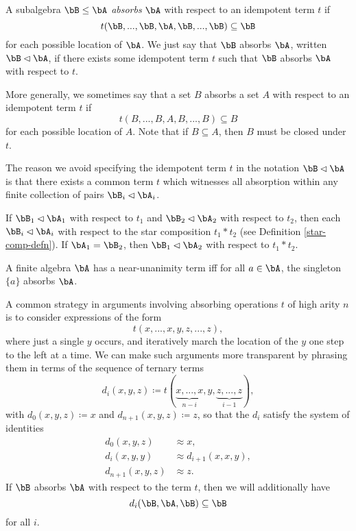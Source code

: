 \begin{defn} A subalgebra $\bB \le \bA$ \emph{absorbs} $\bA$ with respect to an idempotent term $t$ if
\[
t(\bB, ..., \bB, \bA, \bB, ..., \bB) \subseteq \bB
\]
for each possible location of $\bA$. We just say that $\bB$ absorbs $\bA$, written $\bB \lhd \bA$, if there exists some idempotent term $t$ such that $\bB$ absorbs $\bA$ with respect to $t$.

More generally, we sometimes say that a set $B$ absorbs a set $A$ with respect to an idempotent term $t$ if
\[
t(B, ..., B, A, B, ..., B) \subseteq B
\]
for each possible location of $A$. Note that if $B \subseteq A$, then $B$ must be closed under $t$.
\end{defn}

The reason we avoid specifying the idempotent term $t$ in the notation $\bB \lhd \bA$ is that there exists a common term $t$ which witnesses all absorption within any finite collection of pairs $\bB_i \lhd \bA_i$.

\begin{prop} If $\bB_1 \lhd \bA_1$ with respect to $t_1$ and $\bB_2 \lhd \bA_2$ with respect to $t_2$, then each $\bB_i \lhd \bA_i$ with respect to the star composition $t_1*t_2$ (see Definition \ref{star-comp-defn}). If $\bA_1 = \bB_2$, then $\bB_1 \lhd \bA_2$ with respect to $t_1*t_2$.
\end{prop}

\begin{cor} A finite algebra $\bA$ has a near-unanimity term iff for all $a \in \bA$, the singleton $\{a\}$ absorbs $\bA$.
\end{cor}

A common strategy in arguments involving absorbing operations $t$ of high arity $n$ is to consider expressions of the form
\[
t(x,...,x,y,z,...,z),
\]
where just a single $y$ occurs, and iteratively march the location of the $y$ one step to the left at a time. We can make such arguments more transparent by phrasing them in terms of the sequence of ternary terms
\[
d_i(x,y,z) \coloneqq t(\underbrace{x,...,x}_{n-i},y,\underbrace{z,...,z}_{i-1}),
\]
with $d_0(x,y,z) \coloneqq x$ and $d_{n+1}(x,y,z) \coloneqq z$, so that the $d_i$ satisfy the system of identities
\begin{align*}
d_0(x,y,z) &\approx x,\\
d_i(x,y,y) &\approx d_{i+1}(x,x,y),\\
d_{n+1}(x,y,z) &\approx z.
\end{align*}
If $\bB$ absorbs $\bA$ with respect to the term $t$, then we will additionally have
\[
d_i(\bB,\bA,\bB) \subseteq \bB
\]
for all $i$.

